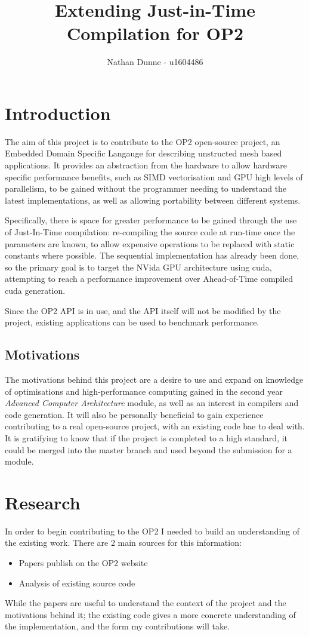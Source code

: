\documentclass[11pt]{article}
\title{Extending Just-in-Time Compilation for OP2}
\author{Nathan Dunne - u1604486}
\begin{document}
\maketitle

\section*{Introduction}
The aim of this project is to contribute to the OP2 open-source project, an Embedded Domain Specific Langauge for describing unstructed mesh based applications. It provides an abstraction from the hardware to allow hardware specific performance benefits, such as SIMD vectorisation and GPU high levels of parallelism, to be gained without the programmer needing to understand the latest implementations, as well as allowing portability between different systems.
\par Specifically, there is space for greater performance to be gained through the use of Just-In-Time compilation: re-compiling the source code at run-time once the parameters are known, to allow expensive operations to be replaced with static constants where possible. The sequential implementation has already been done, so the primary goal is to target the NVida GPU architecture using cuda, attempting to reach a performance improvement over Ahead-of-Time compiled cuda generation.
\par Since the OP2 API is in use, and the API itself will not be modified by the project, existing applications can be used to benchmark performance.
\subsection*{Motivations}
The motivations behind this project are a desire to use and expand on knowledge of optimisations and high-performance computing gained in the second year \textit{Advanced Computer Architecture} module, as well as an interest in compilers and code generation. It will also be personally beneficial to gain experience contributing to a real open-source project, with an existing code bae to deal with. It is gratifying to know that if the project is completed to a high standard, it could be merged into the master branch and used beyond the submission for a module.
\section*{Research}
In order to begin contributing to the OP2 I needed to build an understanding of the existing work. There are 2 main sources for this information:
\begin{itemize}
 \item{Papers publish on the OP2 website}
 \item{Analysis of existing source code}
\end{itemize}
While the papers are useful to understand the context of the project and the motivations behind it; the existing code gives a more concrete understanding of the implementation, and the form my contributions will take.
\end{document}
